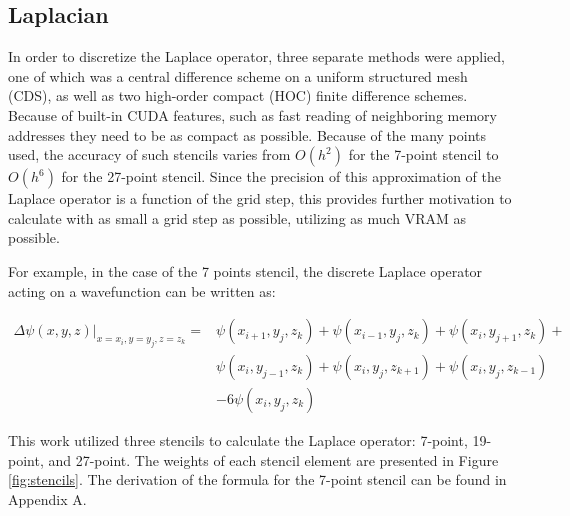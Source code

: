 \subsection{Laplacian}
In order to discretize the Laplace operator, three separate methods were applied, one of which was a central difference scheme on a uniform structured mesh (CDS), as well as two high-order compact (HOC) finite difference schemes.\cite{spotz1996hoc}
Because of built-in CUDA features, such as fast reading of neighboring memory addresses
they need to be as compact as possible. Because of the many points used, the accuracy of such stencils varies from $O(h^2)$ for the 7-point stencil to $O(h^6)$ for the 27-point stencil. Since the precision of this approximation of the Laplace operator is a function of the grid step, this provides further motivation to calculate with as small a grid step as possible, utilizing as much VRAM as possible.

For example, in the case of the 7 points stencil, the discrete Laplace operator acting on a wavefunction can be written as:

\begin{equation}
	\begin{aligned}
		\Delta \psi(x,y,z) \lvert_{x=x_i,y=y_j,z=z_k} =
		& \psi(x_{i+1},y_j,z_k) + \psi(x_{i-1},y_j,z_k) + \psi(x_i,y_{j+1},z_k) + \\
		& \psi(x_i,y_{j-1},z_k) + \psi(x_i,y_j,z_{k+1}) + \psi(x_i,y_j,z_{k-1}) \\
		& -6\psi(x_i,y_j,z_k)
	\end{aligned}
\end{equation}

This work utilized three stencils to calculate the Laplace operator: 7-point, 19-point, and 27-point. The weights of each stencil element are presented in Figure \ref{fig:stencils}.
The derivation of the formula for the 7-point stencil can be found in Appendix A.

